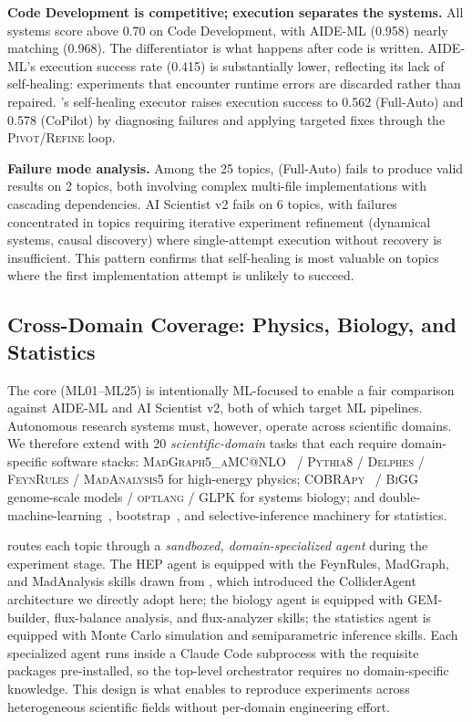\noindent \textbf{Code Development is competitive; execution separates the systems.} All systems score above 0.70 on Code Development, with AIDE-ML (0.958) nearly matching \system{} (0.968). The differentiator is what happens after code is written. AIDE-ML's execution success rate (0.415) is substantially lower, reflecting its lack of self-healing: experiments that encounter runtime errors are discarded rather than repaired. \system{}'s self-healing executor raises execution success to 0.562 (Full-Auto) and 0.578 (CoPilot) by diagnosing failures and applying targeted fixes through the \textsc{Pivot}/\textsc{Refine} loop.

\noindent \textbf{Failure mode analysis.} Among the 25 topics, \system{} (Full-Auto) fails to produce valid results on 2 topics, both involving complex multi-file implementations with cascading dependencies. AI Scientist v2 fails on 6 topics, with failures concentrated in topics requiring iterative experiment refinement (dynamical systems, causal discovery) where single-attempt execution without recovery is insufficient. This pattern confirms that self-healing is most valuable on topics where the first implementation attempt is unlikely to succeed.

\vspace{-0.3em}
\subsection{Cross-Domain Coverage: Physics, Biology, and Statistics}
\label{sec:scidomain}
\vspace{-0.3em}

The \bench{} core (\textsc{ML01}--\textsc{ML25}) is intentionally ML-focused to enable a fair comparison against AIDE-ML and AI Scientist v2, both of which target ML pipelines.
Autonomous research systems must, however, operate across scientific domains.
We therefore extend \bench{} with 20 \emph{scientific-domain} tasks that each require domain-specific software stacks: \textsc{MadGraph5\_aMC@NLO}~\citep{Alwall2014} / \textsc{Pythia8} / \textsc{Delphes} / \textsc{FeynRules} / \textsc{MadAnalysis5} for high-energy physics; \textsc{COBRApy}~\citep{Ebrahim2013} / \textsc{BiGG}~\citep{King2016} genome-scale models / \textsc{optlang} / GLPK for systems biology; and double-machine-learning~\citep{Chernozhukov2018}, bootstrap~\citep{Efron1979}, and selective-inference machinery for statistics.

\system{} routes each topic through a \emph{sandboxed, domain-specialized agent} during the experiment stage.
The HEP agent is equipped with the FeynRules, MadGraph, and MadAnalysis skills drawn from \citet{qiu2026endtoendarchitecturecolliderphysics}, which introduced the ColliderAgent architecture we directly adopt here; the biology agent is equipped with GEM-builder, flux-balance analysis, and flux-analyzer skills; the statistics agent is equipped with Monte Carlo simulation and semiparametric inference skills.
Each specialized agent runs inside a Claude Code subprocess with the requisite packages pre-installed, so the top-level orchestrator requires no domain-specific knowledge.
This design is what enables \system{} to reproduce experiments across heterogeneous scientific fields without per-domain engineering effort.


